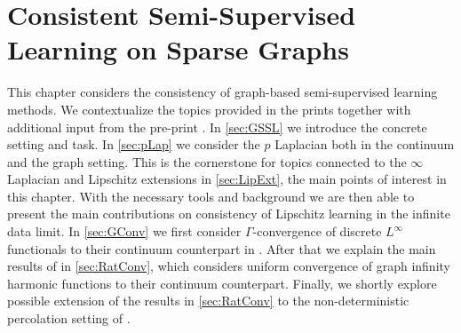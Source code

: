 \chapter{Consistent Semi-Supervised Learning on Sparse Graphs}\label{ch:SSL}

This chapter considers the consistency of graph-based semi-supervised learning methods. We contextualize the topics provided in the prints \cite{roith2022continuum, bungert2021uniform} together with additional input from the pre-print \cite{bungert2022ratio}. In \cref{sec:GSSL} we introduce the concrete setting and task. In \cref{sec:pLap} we consider the $p$ Laplacian both in the continuum and the graph setting. This is the cornerstone for topics connected to the $\infty$ Laplacian and Lipschitz extensions in \cref{sec:LipExt}, the main points of interest in this chapter. With the necessary tools and background we are then able to present the main contributions on consistency of Lipschitz learning in the infinite data limit. In \cref{sec:GConv} we first consider $\Gamma$-convergence of discrete $L^\infty$ functionals to their continuum counterpart in \cite{roith2022continuum}. After that we explain the main results of \cite{bungert2021uniform} in \cref{sec:RatConv}, which considers uniform convergence of graph infinity harmonic functions to their continuum counterpart. Finally, we shortly explore possible extension of the results in \cref{sec:RatConv} to the non-deterministic percolation setting of  \cite{bungert2022ratio}.
%
%
%
\begin{center}%
\end{center}
%
%
%
%
%
%
%
